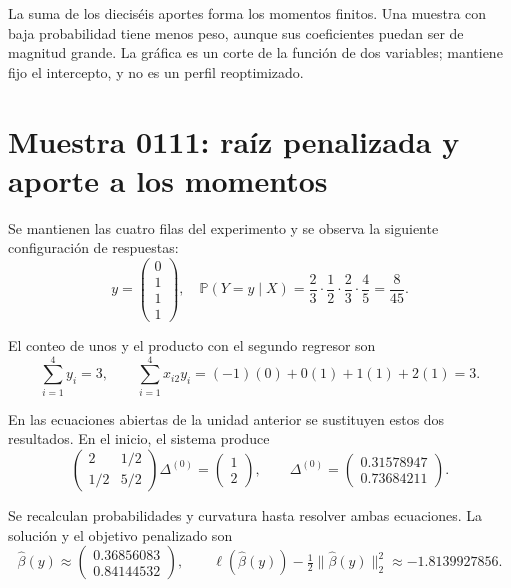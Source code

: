 \documentclass[11pt,a4paper]{article}
\newcommand{\Prob}{\mathbb P}
\begin{document}
La suma de los dieciséis aportes forma los momentos finitos.
Una muestra con baja probabilidad tiene menos peso,
aunque sus coeficientes puedan ser de magnitud grande.
La gráfica es un corte de la función de dos variables;
mantiene fijo el intercepto, y no es un perfil reoptimizado.
\endgroup

\clearpage
\section{Muestra 0111: raíz penalizada y aporte a los momentos}\label{logit132}
\begingroup\small
\setlength{\abovedisplayskip}{4pt}\setlength{\belowdisplayskip}{4pt}
Se mantienen las cuatro filas del experimento y se observa
la siguiente configuración de respuestas:
\[
y=\begin{pmatrix}0\\1\\1\\1\end{pmatrix},\quad \Prob(Y=y\mid X)=\frac{2}{3}\cdot\frac{1}{2}\cdot\frac{2}{3}\cdot\frac{4}{5}=\frac{8}{45}.
\]

El conteo de unos y el producto con el segundo regresor son
\[
\sum_{i=1}^4 y_i=3,\qquad\sum_{i=1}^4x_{i2}y_i=(-1)(0)+0(1)+1(1)+2(1)=3.
\]

En las ecuaciones abiertas de la unidad anterior se sustituyen
estos dos resultados. En el inicio, el sistema produce
\[
\begin{pmatrix}2&1/2\\1/2&5/2\end{pmatrix}\Delta^{(0)}=\begin{pmatrix}1\\2\end{pmatrix},\qquad\Delta^{(0)}=\begin{pmatrix}0.31578947\\0.73684211\end{pmatrix}.
\]

Se recalculan probabilidades y curvatura hasta resolver
ambas ecuaciones. La solución y el objetivo penalizado son
\[
\widehat\beta(y)\approx\begin{pmatrix}0.36856083\\0.84144532\end{pmatrix},\qquad \ell(\widehat\beta(y))-\tfrac12\|\widehat\beta(y)\|_2^2\approx-1.8139927856.
\]
\end{document}
